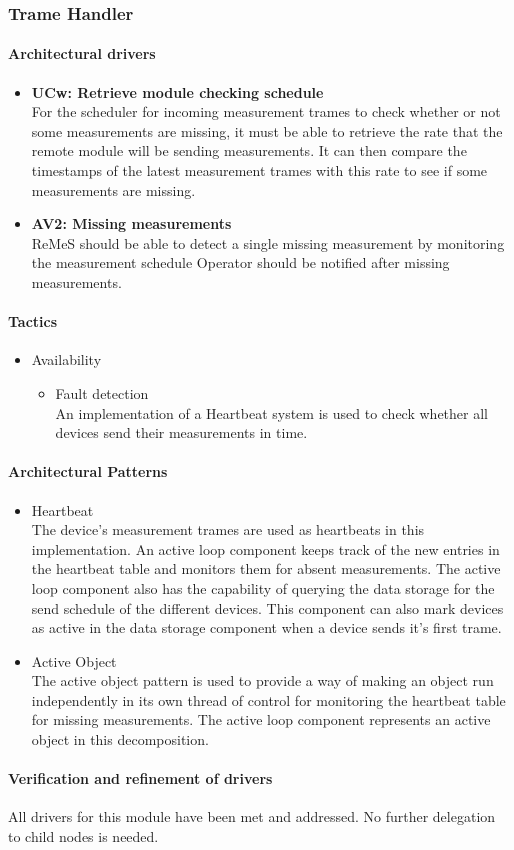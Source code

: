 \subsubsection{Trame Handler}
\paragraph{Architectural drivers}

\begin{itemize}
	\item \textbf{UCw: Retrieve module checking schedule}\\
	For the scheduler for incoming measurement trames to check whether or not some
		measurements are missing, it must be able to retrieve the rate that the 
		remote module will be sending measurements. It can then compare the timestamps
		of the latest measurement trames with this rate to see if some measurements
		are missing.
	\item \textbf{AV2: Missing measurements}\\
	ReMeS should be able to detect a single missing measurement by monitoring the measurement schedule
	Operator should be notified after missing measurements.	
\end{itemize}
\paragraph{Tactics}
\begin{itemize}
	\item Availability 
	\begin{itemize}
		\item Fault detection \\
		An implementation of a Heartbeat system is used to check whether all devices send their measurements in time.
	\end{itemize}
\end{itemize}
\paragraph{Architectural Patterns}
\begin{itemize}
	\item{Heartbeat}\\
	The device's measurement trames are used as heartbeats in this implementation.
	An active loop component keeps track of the new entries in the heartbeat table and monitors them for absent measurements.
	The active loop component also has the capability of querying the data storage for the send schedule of the different devices.
	This component can also mark devices as active in the data storage component when a device sends it's first trame. 
	\item{Active Object}\\
	The active object pattern is used to provide a way of making an object run independently in its own thread of control for monitoring the heartbeat table for missing measurements.
	The active loop component represents an active object in this decomposition.
\end{itemize}

\paragraph{Verification and refinement of drivers}
All drivers for this module have been met and addressed. No further delegation to child nodes is needed.
